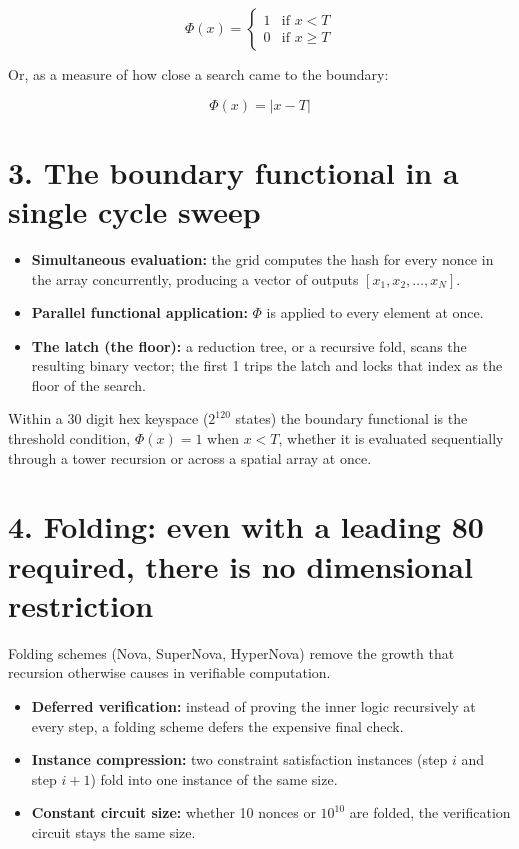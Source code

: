 \[
\Phi(x) = \begin{cases} 1 & \text{if } x < T \\ 0 & \text{if } x \ge T \end{cases}
\]

Or, as a measure of how close a search came to the boundary:

\[
\Phi(x) = |x - T|
\]

\section{\texorpdfstring{3. The boundary functional in a single cycle sweep}{3. The boundary functional in a single cycle sweep}}

\begin{itemize}
\item \textbf{Simultaneous evaluation:} the grid computes the hash for every nonce in the array concurrently, producing a vector of outputs \([x_1, x_2, \ldots, x_N]\).
\item \textbf{Parallel functional application:} \(\Phi\) is applied to every element at once.
\item \textbf{The latch (the floor):} a reduction tree, or a recursive fold, scans the resulting binary vector; the first 1 trips the latch and locks that index as the floor of the search.
\end{itemize}

Within a 30 digit hex keyspace (\(2^{120}\) states) the boundary functional is the threshold condition, \(\Phi(x) = 1\) when \(x < T\), whether it is evaluated sequentially through a tower recursion or across a spatial array at once.

\section{\texorpdfstring{4. Folding: even with a leading 80 required, there is no dimensional restriction}{4. Folding: even with a leading 80 required, there is no dimensional restriction}}

Folding schemes (Nova, SuperNova, HyperNova) remove the growth that recursion otherwise causes in verifiable computation.

\begin{itemize}
\item \textbf{Deferred verification:} instead of proving the inner logic recursively at every step, a folding scheme defers the expensive final check.
\item \textbf{Instance compression:} two constraint satisfaction instances (step \(i\) and step \(i+1\)) fold into one instance of the same size.
\item \textbf{Constant circuit size:} whether 10 nonces or \(10^{10}\) are folded, the verification circuit stays the same size.
\end{itemize}

